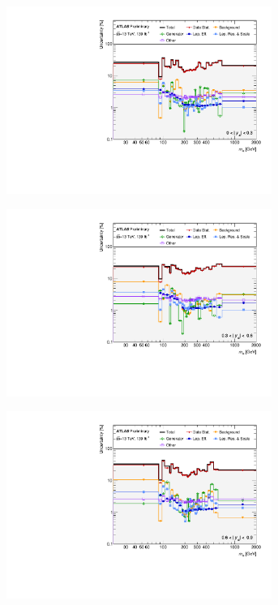 \begin{figure}[hp]
    \centering
    \begin{subfigure}{.49\textwidth}\centering\includegraphics[width = 0.95\textwidth]{Figures/m4l/Systematics/Unfolded/UnfoldedSys_M4lvRapiditybin_Stack_Paper0.pdf}\end{subfigure}
    \begin{subfigure}{.49\textwidth}\centering\includegraphics[width = 0.95\textwidth]{Figures/m4l/Systematics/Unfolded/UnfoldedSys_M4lvRapiditybin_Stack_Paper1.pdf}\end{subfigure}
    \begin{subfigure}{.49\textwidth}\centering\includegraphics[width = 0.95\textwidth]{Figures/m4l/Systematics/Unfolded/UnfoldedSys_M4lvRapiditybin_Stack_Paper2.pdf}\end{subfigure}

\end{figure}

